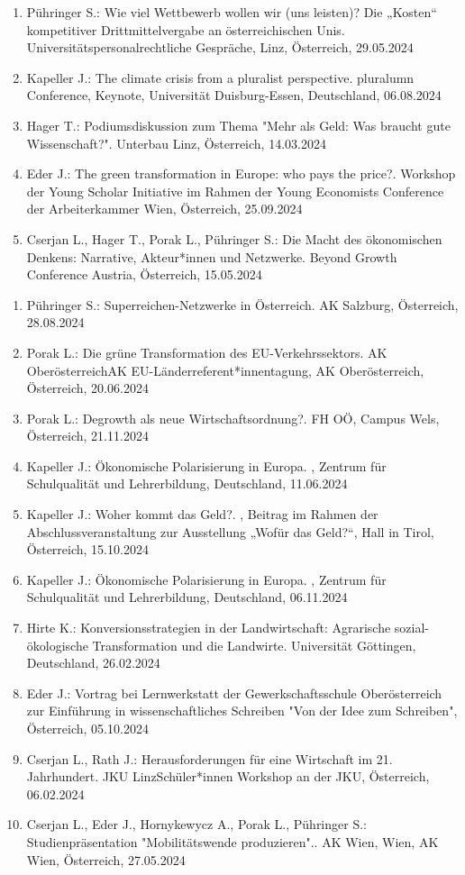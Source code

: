 \begin{enumerate}
	\item Pühringer S.: Wie viel Wettbewerb wollen wir (uns leisten)? Die „Kosten“ kompetitiver Drittmittelvergabe an österreichischen Unis. Universitätspersonalrechtliche Gespräche, Linz, Österreich, 29.05.2024
	\item Kapeller J.: The climate crisis from a pluralist perspective. pluralumn Conference, Keynote, Universität Duisburg-Essen, Deutschland, 06.08.2024
	\item Hager T.: Podiumsdiskussion zum Thema "Mehr als Geld: Was braucht gute Wissenschaft?". Unterbau Linz, Österreich, 14.03.2024
	\item Eder J.: The green transformation in Europe: who pays the price?. Workshop der Young Scholar Initiative im Rahmen der Young Economists Conference der Arbeiterkammer Wien, Österreich, 25.09.2024
	\item Cserjan L., Hager T., Porak L., Pühringer S.: Die Macht des ökonomischen Denkens: Narrative, Akteur*innen und Netzwerke. Beyond Growth Conference Austria, Österreich, 15.05.2024
\end{enumerate}

\begin{enumerate}
	\item Pühringer S.: Superreichen-Netzwerke in Österreich. AK Salzburg, Österreich, 28.08.2024
	\item Porak L.: Die grüne Transformation des EU-Verkehrssektors. AK OberösterreichAK EU-Länderreferent*innentagung, AK Oberösterreich, Österreich, 20.06.2024
	\item Porak L.: Degrowth als neue Wirtschaftsordnung?. FH OÖ, Campus Wels, Österreich, 21.11.2024
	\item Kapeller J.: Ökonomische Polarisierung in Europa. , Zentrum für Schulqualität und Lehrerbildung, Deutschland, 11.06.2024
	\item Kapeller J.: Woher kommt das Geld?. , Beitrag im Rahmen der Abschlussveranstaltung zur Ausstellung „Wofür das Geld?“, Hall in Tirol, Österreich, 15.10.2024
	\item Kapeller J.: Ökonomische Polarisierung in Europa. , Zentrum für Schulqualität und Lehrerbildung, Deutschland, 06.11.2024
	\item Hirte K.: Konversionsstrategien in der Landwirtschaft: Agrarische sozial-ökologische Transformation und die Landwirte. Universität Göttingen, Deutschland, 26.02.2024
	\item Eder J.: Vortrag bei Lernwerkstatt der Gewerkschaftsschule Oberösterreich zur Einführung in wissenschaftliches Schreiben "Von der Idee zum Schreiben", Österreich, 05.10.2024
	\item Cserjan L., Rath J.: Herausforderungen für eine Wirtschaft im 21. Jahrhundert. JKU LinzSchüler*innen Workshop an der JKU, Österreich, 06.02.2024
	\item Cserjan L., Eder J., Hornykewycz A., Porak L., Pühringer S.: Studienpräsentation "Mobilitätswende produzieren".. AK Wien, Wien, AK Wien, Österreich, 27.05.2024
\end{enumerate}

